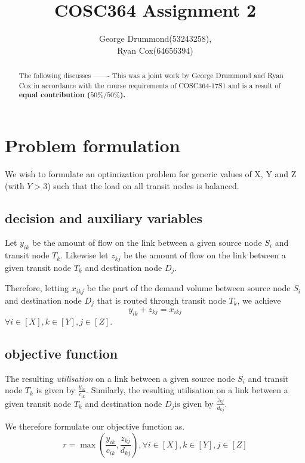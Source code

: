 \documentclass[12pt,twoside]{article}
\begin{document}
\title{COSC364 Assignment 2}
\author{George Drummond(53243258), \\Ryan Cox(64656394)}
\maketitle
\thispagestyle{empty}

\begin{abstract}
The following discusses -------
This was a joint work by George Drummond and Ryan Cox in accordance with the course requirements of COSC364-17S1 and is a result of \bf{equal} contribution ($50\% / 50\%$).
\end{abstract}

\tableofcontents

\newpage
\section{ Problem formulation}
We wish to formulate an optimization problem for generic values of X, Y and Z (with $ Y> 3$) such that the load on all transit nodes is balanced.

\subsection{decision and auxiliary variables}
Let $y_{ik}$ be the amount of flow on the link between a given source node $S_i$ and transit node $T_k$.
Likewise let $z_{kj}$ be the amount of flow on the link between a given transit node $T_k$ and destination node $D_j$.

Therefore, letting $x_{ikj}$ be the part of the demand volume between source node $S_i$ and destination node $D_j$ that is routed through transit node $T_k$, we achieve 
\begin{equation}\label{1}
	y_{ik} + z_{kj} = x_{ikj} 
\end{equation}
$\forall i \in [X], k \in [Y], j \in [Z]$.

\subsection{objective function}\label{Sec: objf}
The resulting \emph{utilisation} on a link between a given source node $S_i$ and transit node $T_k$ is given by $\frac{y_{ik}}{c_{ik}}$. Similarly, the resulting utilisation on a link between a given transit node $T_k$ and destination node $D_j$is given by $\frac{z_{kj}}{d_{kj}}$.

We therefore formulate our objective function as.
\begin{equation}\label{2}
	r = \max(\frac{y_{ik}}{c_{ik}},\frac{z_{kj}}{d_{kj}}), \forall i \in [X], k \in [Y], j \in [Z]
\end{equation}
\end{document}
